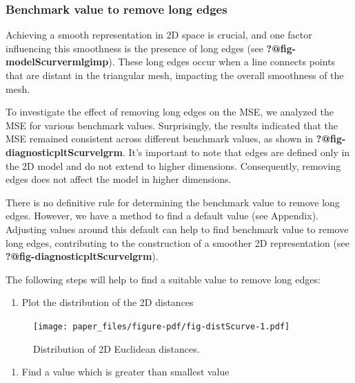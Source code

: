 \documentclass[
  12pt]{article}
\providecommand{\tightlist}{%
  \setlength{\itemsep}{0pt}\setlength{\parskip}{0pt}}\usepackage{longtable,booktabs,array}
\begin{document}
\hypertarget{benchmark-value-to-remove-long-edges}{%
\subsubsection{Benchmark value to remove long
edges}\label{benchmark-value-to-remove-long-edges}}

Achieving a smooth representation in 2D space is crucial, and one factor
influencing this smoothness is the presence of long edges (see
\textbf{?@fig-modelScurvermlgimp}). These long edges occur when a line
connects points that are distant in the triangular mesh, impacting the
overall smoothness of the mesh.

To investigate the effect of removing long edges on the MSE, we analyzed
the MSE for various benchmark values. Surprisingly, the results
indicated that the MSE remained consistent across different benchmark
values, as shown in \textbf{?@fig-diagnosticpltScurvelgrm}. It's
important to note that edges are defined only in the 2D model and do not
extend to higher dimensions. Consequently, removing edges does not
affect the model in higher dimensions.

There is no definitive rule for determining the benchmark value to
remove long edges. However, we have a method to find a default value
(see Appendix). Adjusting values around this default can help to find
benchmark value to remove long edges, contributing to the construction
of a smoother 2D representation (see
\textbf{?@fig-diagnosticpltScurvelgrm}).

The following steps will help to find a suitable value to remove long
edges:

\begin{enumerate}
\def\labelenumi{\arabic{enumi}.}
\tightlist
\item
  Plot the distribution of the 2D distances
\end{enumerate}

\begin{figure}[H]

{\centering \texttt{[image: paper\_files/figure-pdf/fig-distScurve-1.pdf]}

}

\caption{\label{fig-distScurve}Distribution of 2D Euclidean distances.}

\end{figure}

\begin{enumerate}
\def\labelenumi{\arabic{enumi}.}
\setcounter{enumi}{1}
\tightlist
\item
  Find a value which is greater than smallest value
\end{enumerate}
\end{document}
